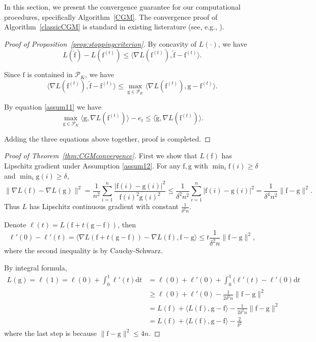 \documentclass[11pt]{article}
\numberwithin{equation}{section}
\newcommand{\PS}{\mathcal{P}}
\newcommand{\fv}{\mathrm{f}}
\newcommand{\gv}{\mathrm{g}}
\begin{document}
\begin{appendices}
In this section, we present the convergence guarantee for our computational procedures, specifically Algorithm~\ref{CGM}. The convergence proof of Algorithm~\ref{classicCGM} is standard in existing listerature (see, e.g., \citet{jaggi2013revisiting}).

\begin{proof}[Proof of Proposition~\ref{prop:stoppingcriterion}]
By concavity of $L(\cdot)$, we have
\begin{equation}
L(\hat{\fv}) - L(\fv^{(t)}) \leq \langle \nabla L(\fv^{(t)}), \hat{\fv} - \fv^{(t)} \rangle.
\label{eq:alg_concave}
\end{equation}

Since $\fv$ is contained in $\PS_K$, we have
\begin{equation}
\langle \nabla L(\fv^{(t)}), \hat{\fv} - \fv^{(t)} \rangle \leq  \max_{\gv \in \PS_K} \langle \nabla L(\fv^{(t)}), \gv - \fv^{(t)} \rangle.
\label{eq:alg_subprobmax_ineq}
\end{equation}

By equation \eqref{assum11} we have
\[
\max_{{\gv} \in \PS_K} \langle {\gv}, \nabla L(\fv^{(t)}) \rangle- e_t
\leq \langle \tilde{\gv}, \nabla L(\fv^{(t)})\rangle.
\]

Adding the three equations above together, proof is completed.

\end{proof}

\begin{proof}[Proof of Theorem~\ref{thm:CGMconvergence}]

First we show that $L(\fv)$ has Lipschitz gradient under Assumption \ref{assum12}. For any $\fv, \gv$ with $\min_i \fv(i) \geq \delta$ and $\min_i \gv(i) \geq \delta$,
\[
\| \nabla L(\fv) - \nabla L(\gv) \|^2 = \frac{1}{n^2} \sum_{i=1}^n \frac{|\fv(i) - \gv(i)|^2}{\fv(i)^2\gv(i)^2} \leq 
\frac{1}{\delta^2 n^2} \sum_{i=1}^n |\fv(i) - \gv(i)|^2 = \frac{1}{\delta^4 n^2} \| \fv -\gv\|^2.
\]
Thus $L$ has Lipschitz continuous gradient with constant $\frac{1}{\delta^2 n}$.

Denote $\ell(t) = L(\fv + t(\gv -\fv))$, then 
\[
 \ell'(0) -\ell'(t)=  \langle \nabla L(\fv + t(\gv-\fv)) - \nabla L(\fv), \fv -\gv \rangle  \leq t \frac{1}{\delta^2 n} \| \fv - \gv\|^2,
\]
where the second inequality is by Cauchy-Schwarz.

By integral formula,
\[
\begin{split}
L(\gv) = \ell(1) = \ell(0) +\int_0^1 \ell'(t) \mathrm{d} t
& = \ell(0) + \ell'(0) + \int_0^1 (\ell'(t)- \ell'(0) \mathrm{d} t\\
& \geq  \ell(0) + \ell'(0) - \frac{1}{2\delta^2 n} \| \fv - \gv\|^2\\
& = L(\fv) + \langle L(\fv), \gv - \fv \rangle - \frac{1}{2\delta^2 n} \| \fv - \gv\|^2\\
& =  L(\fv) + \langle L(\fv), \gv - \fv \rangle - \frac{2}{\delta^2}
\end{split}
\]
where the last step is because $\| \fv - \gv\|^2 \leq 4n$.


\end{proof}
\end{appendices}
\end{document}
